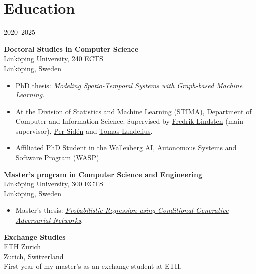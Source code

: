 \section*{Education}
\begin{labeling}{2020--2025}
\item [2020--2025] \textbf{Doctoral Studies in Computer Science}\\
        Linköping University, 240 ECTS\\
        {\footnotesize Linköping, Sweden}
        \begin{itemize}
            \item PhD thesis: \href{https://urn.kb.se/resolve?urn=urn:nbn:se:liu:diva-215665}{\textit{Modeling Spatio-Temporal Systems with Graph-based Machine Learning}}.
            \item At the Division of Statistics and Machine Learning (STIMA), Department of Computer and Information Science. Supervised by \href{https://lindsten.netlify.app/}{Fredrik Lindsten} (main supervisor), \href{https://scholar.google.se/citations?user=0UomzRIAAAAJ}{Per Sidén} and \href{https://www.smhi.se/en/research/research-departments/meteorology/tomas-landelius-1.4817}{Tomas Landelius}.
            \item Affiliated PhD Student in the \href{https://wasp-sweden.org/}{Wallenberg AI, Autonomous Systems and Software Program (WASP)}.
        \end{itemize}
    \item [2015--2020]
        \textbf{Master's program in Computer Science and Engineering}\\%
        Linköping University, 300 ECTS\\
        {\footnotesize Linköping, Sweden}
        \begin{itemize}
            \item Master's thesis: \href{http://urn.kb.se/resolve?urn=urn:nbn:se:liu:diva-166637}{\textit{Probabilistic Regression using Conditional Generative Adversarial Networks}}.
        \end{itemize}
    \item [2018--2019] \textbf{Exchange Studies}\\
        ETH Zurich\\
        {\footnotesize Zurich, Switzerland}\\
        First year of my master's as an exchange student at ETH.
\end{labeling}
